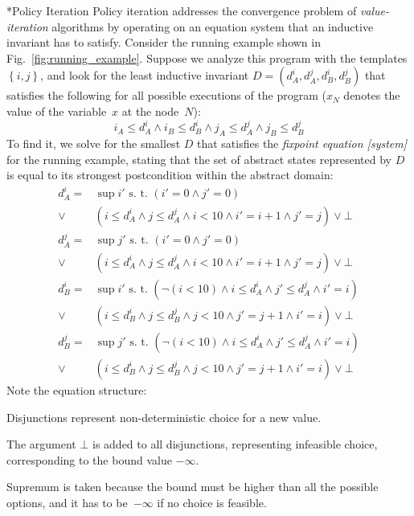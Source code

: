 \documentclass{llncs}
\makeatletter
\newcommand{\setof}[1]{\ensuremath{\left \{{#1}\right\}}}
\renewcommand{\paragraph}{\@startsection{paragraph}{4}{\z@}{0.8ex \@plus 0ex \@minus 1ex}{-1em}{\normalfont\normalsize\bfseries}}
\makeatother
\begin{document}
\paragraph*{Policy Iteration} Policy iteration addresses the convergence problem
of \emph{value-iteration} algorithms by operating on an equation system that an
inductive invariant has to satisfy.
Consider the running example shown in Fig.~\ref{fig:running_example}.
Suppose we analyze this program with the
templates $\setof{i, j}$, and look for the least inductive invariant
$D = (d^i_A, d^j_A, d^i_B, d^j_B)$ that satisfies the following for all
possible
executions of the program ($x_N$ denotes the value of the variable~$x$ at the node~$N$):
\begin{equation*}
i_A \leq d^i_A \land i_B \leq d^i_B \land j_A \leq d^j_A \land j_B \leq d^j_B
\end{equation*}
To find it, we solve for the smallest $D$
that satisfies the \emph{fixpoint equation [system]}
for the running example,
stating that the set of abstract states represented by $D$ is equal to its strongest
postcondition within the abstract domain:
\[
\begin{split}
    d^{i}_{A} =& \sup{i'} \mbox{ s. t. } (i' = 0 \land j'=0) \\
        \lor & (i \leq d^{i}_{A} \land j \leq d^j_A \land i < 10 \land i'=i
                  + 1 \land j'=j) \lor \bot \\
    d^{j}_{A} =& \sup{j'} \mbox{ s. t. } (i' = 0 \land j'=0) \\
        \lor &
        (i \leq d^{i}_{A} \land j \leq d^j_A \land i < 10 \land i' = i
                  + 1 \land j' = j) \lor \bot \\
    d^{i}_{B} =& \sup{i'} \mbox{ s. t. } (\lnot (i < 10) \land i \leq d^i_A
    \land j' \leq d^j_A \land i'=i) \\
          \lor &
               (i \leq d^i_B \land j \leq d^j_B \land j < 10 \land j' = j +
               1 \land i' = i) \lor \bot \\
    d^{j}_{B} =& \sup{j'} \mbox{ s. t. } (\lnot (i < 10) \land i \leq d^i_A
    \land j' \leq d^j_A \land i'=i) \\
    \lor &
               (i \leq d^i_B \land j \leq d^j_B \land j < 10 \land j' = j +
               1 \land i'=i) \lor \bot
\end{split}
\]
Note the equation structure:
\begin{inparaenum}[(i)]
    \item Disjunctions represent non-deterministic choice for a new value.
    \item The argument $\bot$ is added to all disjunctions, representing
        infeasible choice, corresponding to the bound value $-\infty$.
    \item Supremum is taken because the bound must be higher than all the
        possible options, and it has to be~$-\infty$ if no choice is
        feasible.
\end{inparaenum}
\end{document}
